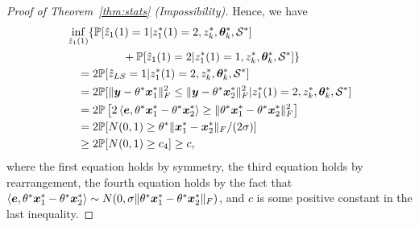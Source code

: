 \documentclass[journal]{IEEEtran}
\theoremstyle{definition}
\theoremstyle{definition}
\newcommand{\off}[1]{\left[#1\right]}
\newcommand{\ang}[1]{\left\langle#1\right\rangle}
\begin{document}
\begin{proof}[Proof of Theorem~\ref{thm:stats} (Impossibility)]
   
   Hence, we have 
   \begin{align}
       & \inf_{\hat z_1(1)} \{ \bbP[\hat z_1(1) = 1| z_1^*(1) = 2, z^*_k,  \mtheta_k^*, \tS^*] \\
       & \quad \quad \quad  \quad \quad  +   \bbP[\hat z_1(1) = 2| z_1^*(1) = 1, z^*_k,  \mtheta_k^*, \tS^*] \} \\
       & \quad = 2 \bbP[ \hat z_{LS} = 1 |  z_1^*(1) = 2, z^*_k,  \mtheta_k^*, \tS^* ] \\
      & \quad  = 2 \bbP[ \onormSize{}{\my - \theta^* \mx_1^*}_F^2 \leq \onormSize{}{\my - \theta^* \mx_2^*}_F^2 | z_1^*(1) = 2, z^*_k , \mtheta_k^*, \tS^*   ] \\
      & \quad = 2 \bbP \off{ 2 \ang{\me, \theta^* \mx_1^* - \theta^*\mx_2^* } \geq  \onormSize{}{\theta^* \mx_1^* - \theta^*\mx_2^*}_F^2 }\\
       & \quad =  2 \bbP[ N(0,1) \geq \theta^* \onormSize{}{\mx_1^* - \mx_2^*}_F /(2\sigma) ] \\
       & \quad \geq 2 \bbP[ N(0,1) \geq c_4 ]   \geq c, \label{eq:inf}
   \end{align}
where the first equation holds by symmetry, the third equation holds by rearrangement, the fourth equation holds by the fact that $\ang{\me, \theta^* \mx_1^* - \theta^*\mx_2^* } \sim N(0, \sigma \onormSize{}{\theta^* \mx_1^* - \theta^*\mx_2^*}_F)$, and $c$ is some positive constant in the last inequality.
   

\end{proof}
\end{document}
